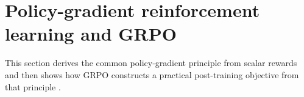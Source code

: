 \section{Policy-gradient reinforcement learning and GRPO}
This section derives the common policy-gradient principle from scalar rewards and then
shows how GRPO constructs a practical post-training objective from that principle
\citep{shen2026firstprinciplesgrpo}.




